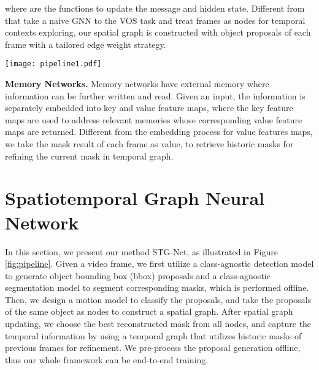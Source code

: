 \documentclass[letterpaper]{article} \usepackage{aaai21}  \usepackage{times}  \usepackage{helvet} \usepackage{courier}  \usepackage[hyphens]{url}  \usepackage{graphicx} \urlstyle{rm} \def\UrlFont{\rm}  \usepackage{graphicx}  \usepackage{natbib}  \usepackage{caption} \frenchspacing  \setlength{\pdfpagewidth}{8.5in}  \setlength{\pdfpageheight}{11in}  \usepackage{amsmath}
\begin{document}
where  are the functions to update the message and hidden state. 
Different from \cite{haller2019spacetime,wang2019zero} that take a naive GNN to the VOS task and treat frames as nodes for temporal contexts exploring, our spatial graph is constructed with object proposals of each frame with a tailored edge weight strategy.

\begin{figure*}[t]
\centering
\texttt{[image: pipeline1.pdf]}
\caption{The framework of our proposed scheme. Given a video frame , we first obtain bbox proposals by an offline detection model and generate corresponding masks by an offline segmentation model. Then we classify each proposal with our motion model to construct intra-object spatial graphs, where each node is a mask proposal. During the spatial graph updating, each node aggregates mask contexts from its neighbors and updates itself to reconstruct more accurate mask. We further design a mask selection function to choose the best reconstructed mask from all nodes in graph. At last, we construct a temporal graph to retrieve historic masks of previous frames for refinement, and obtain the final result of frame .}
\label{fig:pipeline}
\vspace{-10pt}
\end{figure*}

\noindent \textbf{Memory Networks.}
Memory networks \cite{vaswani2017attention,sukhbaatar2015end} have external memory where information can be further written and read. Given an input, the information is separately embedded into key and value feature maps, where the key feature maps are used to address relevant memories whose corresponding value feature maps are returned. 
Different from the embedding process \cite{oh2019video,lu2020video} for value features maps, we take the mask result of each frame as value, to retrieve historic masks for refining the current mask in temporal graph.

\section{Spatiotemporal Graph Neural Network}
In this section, we present our method STG-Net, as illustrated in Figure \ref{fig:pipeline}. Given a video frame, we first utilize a class-agnostic detection model to generate object bounding box (bbox) proposals and a class-agnostic segmentation model to segment corresponding masks, which is performed offline. Then, we design a motion model to classify the proposals, and take the proposals of the same object as nodes to construct a spatial graph. After spatial graph updating, we choose the best reconstructed mask from all nodes, and capture the temporal information by using a temporal graph that utilizes historic masks of previous frames for refinement. We pre-process the proposal generation offline, thus our whole framework can be end-to-end training.
\end{document}
